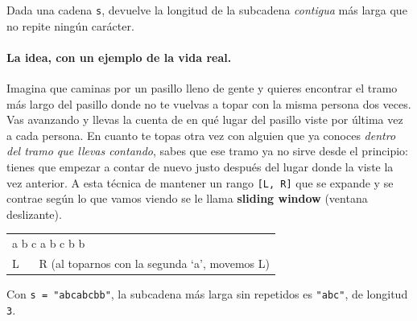 
Dada una cadena \texttt{s}, devuelve la longitud de la subcadena
\emph{contigua} más larga que no repite ningún carácter.

\paragraph{La idea, con un ejemplo de la vida real.} Imagina que caminas por
un pasillo lleno de gente y quieres encontrar el tramo más largo del pasillo
donde no te vuelvas a topar con la misma persona dos veces. Vas avanzando y
llevas la cuenta de en qué lugar del pasillo viste por última vez a cada
persona. En cuanto te topas otra vez con alguien que ya conoces \emph{dentro
del tramo que llevas contando}, sabes que ese tramo ya no sirve desde el
principio: tienes que empezar a contar de nuevo justo después del lugar
donde la viste la vez anterior. A esta técnica de mantener un rango \texttt{[L,
R]} que se expande y se contrae según lo que vamos viendo se le llama
\textbf{sliding window} (ventana deslizante).

\begin{center}
\ttfamily
\begin{tabular}{l}
a b c a b c b b\\
L$\ \ \ \ \ \ \ \ $R (al toparnos con la segunda `a', movemos L)\\
\end{tabular}
\end{center}

\noindent Con \texttt{s = "abcabcbb"}, la subcadena más larga sin repetidos
es \texttt{"abc"}, de longitud \texttt{3}.

